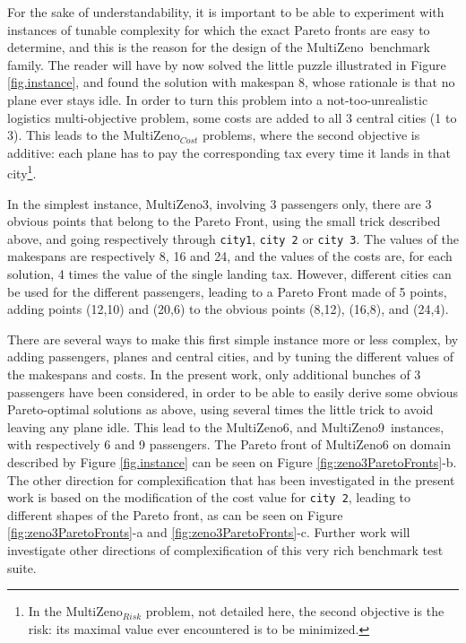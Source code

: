\documentclass{llncs}
\def\MULTIZENO{{\sc MultiZeno}}
\begin{document}
For the sake of understandability, it is important to be able to experiment with instances of tunable complexity for which the exact Pareto fronts are easy to determine, and this is the reason for the design of the \MULTIZENO\ benchmark family.
The reader will have by now solved the little puzzle illustrated in Figure \ref{fig.instance}, and found the solution with makespan 8, whose rationale is that no plane ever stays idle.
In order to turn this problem into a not-too-unrealistic logistics multi-objective problem, some costs are added to all 3 central cities (1 to 3). This leads to the \MULTIZENO$_{Cost}$ problems, where the second objective is additive: each plane has to pay the corresponding tax every time it lands in that city\footnote{In the \MULTIZENO$_{Risk}$ problem, not detailed here, the second objective is the risk: its maximal value ever encountered is to be minimized.}. 

In the simplest instance, \MULTIZENO3, involving 3 passengers only, there are 3 obvious points that belong to the Pareto Front, using the small trick described above, and going respectively through {\tt city1}, {\tt city 2} or {\tt city 3}. The values of the makespans are respectively 8, 16 and 24, and the values of the costs are, for each solution, 4 times the value of the single landing tax. However, different cities can be used for the different passengers, leading to a Pareto Front made of 5 points, adding points (12,10) and (20,6) to the obvious points (8,12), (16,8), and (24,4).

There are several ways to make this first simple instance more or less complex, by adding passengers, planes and central cities, and by tuning the different values of the makespans and costs. In the present work, only additional bunches of 3 passengers have been considered, in order to be able to easily derive some obvious Pareto-optimal solutions as above, using several times the little trick to avoid leaving any plane idle. This lead to the \MULTIZENO6, and  \MULTIZENO9\ instances, with respectively 6 and 9 passengers. The Pareto front of \MULTIZENO6 on domain described by Figure \ref{fig.instance} can be seen on Figure \ref{fig:zeno3ParetoFronts}-b. The other direction for complexification that has been investigated in the present work is based on the modification of the cost value for {\tt city 2}, leading to different shapes of the Pareto front, as can be seen on Figure \ref{fig:zeno3ParetoFronts}-a and \ref{fig:zeno3ParetoFronts}-c.
Further work will investigate other directions of complexification of this very rich benchmark test suite.
\end{document}
